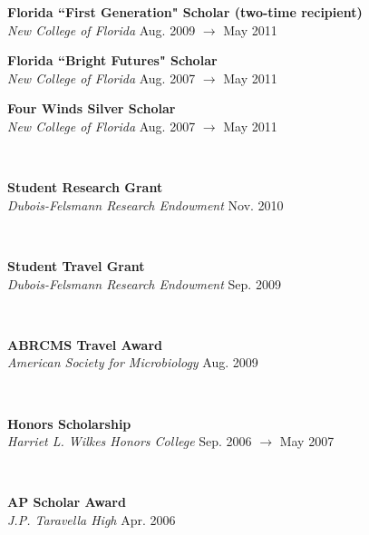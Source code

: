 \documentclass[a4paper,12pt]{article}
\newcommand{\ressubheading}[4]{{\begin{minipage}{\textwidth}
        \textbf{#1} \hfill #2 \\
        \textit{#3} \hfill #4 \\
        \end{minipage}}}
\begin{document}
    \ressubheading{Florida ``First Generation" Scholar {\normalfont(two-time recipient)}}{}{New College of Florida}{Aug. 2009 $\rightarrow$ May 2011}

    \ressubheading{Florida ``Bright Futures" Scholar}{}{New College of Florida}{Aug. 2007 $\rightarrow$ May 2011}

    \ressubheading{Four Winds Silver Scholar}{}{New College of Florida}{Aug. 2007 $\rightarrow$ May 2011}\
    
    
    \ressubheading{Student Research Grant}{}{Dubois-Felsmann Research Endowment}{Nov. 2010}\
    
    \ressubheading{Student Travel Grant}{}{Dubois-Felsmann Research Endowment}{Sep. 2009}\
    
    \ressubheading{ABRCMS Travel Award}{}{American Society for Microbiology}{Aug. 2009}\
    
    \ressubheading{Honors Scholarship}{}{Harriet L. Wilkes Honors College}{Sep. 2006 $\rightarrow$ May 2007}\
    
    \ressubheading{AP Scholar Award}{}{J.P. Taravella High}{Apr. 2006}
\end{document}

